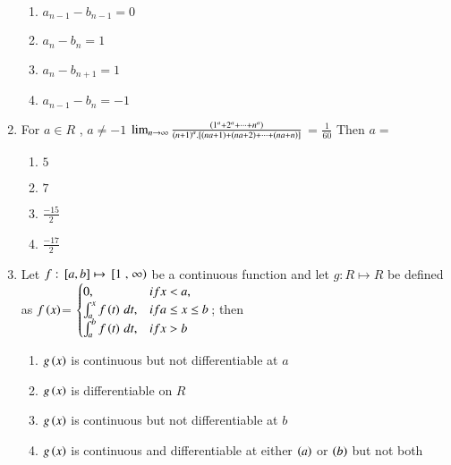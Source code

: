 \documentclass[journal,12pt,twocolumn]{IEEEtran}
\theoremstyle{remark}
\begin{document}
\begin{enumerate}
    \begin{enumerate}[label=(\alph*)]
        
        \item $a_{n-1}-b_{n-1}=0$ 
        \item $a_n-b_n=1$ 
        \item $a_n-b_{n+1}=1$ 
        \item $a_{n-1}-b_n=-1$ 
    \end{enumerate}


    \item 
    For $a\in R$ , $a\neq -1$ 
    $\lim_{n\to\infty}\frac{\left(1^a+2^a+\cdots+n^a\right)}{\left(n+1\right)^a.{}\left[\left(na+1\right)+\left(na+2\right)+\cdots+\left(na+n\right)\right]}$ = $\frac{1}{60}$ Then $a=$

    \hfill 
    {}
    
    \begin{enumerate}[label=(\alph*)]
        
        \item $5$
        \item $7$ 
        \item $\frac{-15}{2}$ 
        \item $\frac{-17}{2}$ 
    \end{enumerate}


    \item 
    Let $f: {}\left[a,b\right]\mapsto {}\left[1\right.,\left.\infty\right)$ be a continuous function and let $g: R\mapsto R$ be defined as 
    $f\left(x\right)$= 
    $\begin{cases}
       0, & if x<a, \\
       \int_{a}^{x}{f\left(t\right) \, dt}, & if a\leq x\leq b \\
       \int_{a}^{b}{f\left(t\right) \, dt}, & if x>b
    \end{cases}$; then 

    \hfill 
    {}
    
    \begin{enumerate}[label=(\alph*)]
        
        \item $g\left(x\right)$ is continuous but not differentiable at $a$
        \item $g\left(x\right)$ is differentiable on $R$
        \item $g\left(x\right)$ is continuous but not differentiable at $b$
        \item $g\left(x\right)$ is continuous and differentiable at either $\left(a\right)$ or $\left(b\right)$ but not both 
    \end{enumerate}



\end{enumerate}
\end{document}
